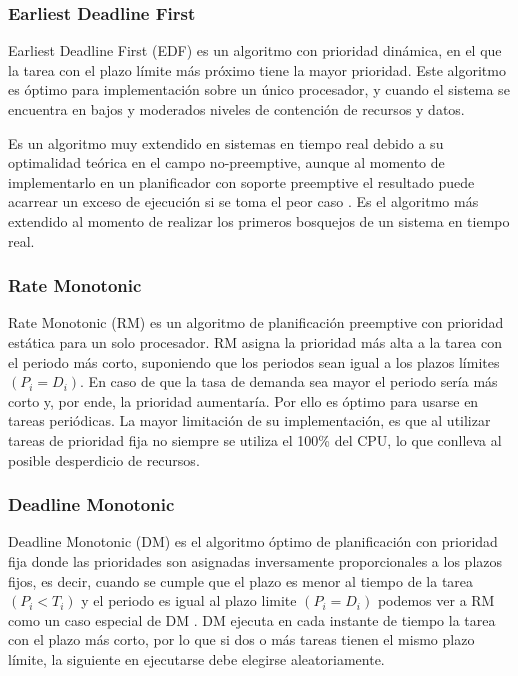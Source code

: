     \subsubsection{Earliest Deadline First} 
    Earliest Deadline First (EDF) es un algoritmo con prioridad dinámica, en el que la tarea con el plazo límite más próximo tiene la mayor prioridad. Este algoritmo es óptimo para implementación sobre un único procesador, y cuando el sistema se encuentra en bajos y moderados niveles de contención de recursos y datos\cite{Liu}.
\newline
     
    Es un algoritmo muy extendido en sistemas en tiempo real debido a su optimalidad teórica en el campo no-preemptive, aunque al momento de implementarlo en un planificador con soporte preemptive el resultado puede acarrear un exceso de ejecución si se toma el peor caso \cite{EmbSysDes}. Es el algoritmo más extendido al momento de realizar los primeros bosquejos de un sistema en tiempo real.
    
     \subsubsection{Rate Monotonic}
    Rate Monotonic (RM) es un algoritmo de planificación preemptive con prioridad estática para un solo procesador\cite{Liu}. RM asigna la prioridad más alta a la tarea con el periodo más corto, suponiendo que los periodos sean igual a los plazos límites \( (P_{i} = D_{i}) \). En caso de que la tasa de demanda sea mayor el periodo sería más corto y, por ende, la prioridad aumentaría. Por ello es óptimo para usarse en tareas periódicas. La mayor limitación de su implementación, es que al utilizar tareas de prioridad fija no siempre se utiliza el 100\%  del CPU, lo que conlleva al posible desperdicio de recursos\cite{RM}.

\subsubsection{Deadline Monotonic}
Deadline Monotonic (DM) es el algoritmo óptimo de planificación con prioridad fija donde las prioridades son asignadas inversamente proporcionales a los plazos fijos, es decir, cuando se cumple que el plazo es menor al tiempo de la tarea \( (P_{i} < T_{i}) \) y el periodo es igual al plazo limite \( (P_{i} = D_{i}) \) podemos ver a RM como un caso especial de DM \cite{NPr}. DM ejecuta en cada instante de tiempo la tarea con el plazo más corto, por lo que si dos o más tareas tienen el mismo plazo límite, la siguiente en ejecutarse debe elegirse aleatoriamente.

